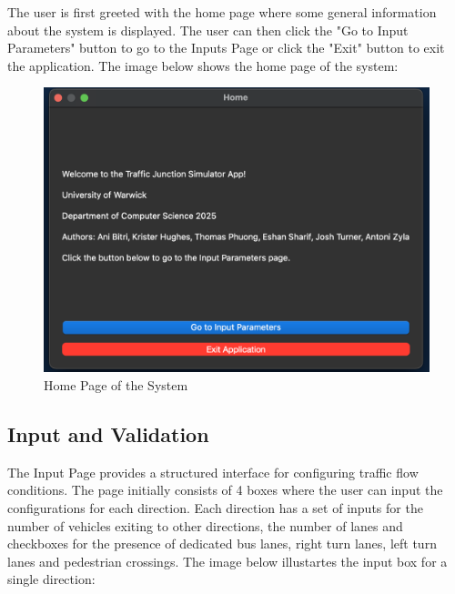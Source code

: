 \documentclass{article}
\begin{document}
        The user is first greeted with the home page where some general information about the system is displayed. The user can then click the "Go to Input Parameters" button to go to the Inputs Page 
        or click the "Exit" button to exit the application. The image below shows the home page of the system:

        \begin{figure}[H]
            \centering
            \includegraphics[width=\textwidth]{homepage.png}
            \caption{Home Page of the System}
            \label{fig:homepage}
        \end{figure}
    
    \subsection{Input and Validation}

        The Input Page provides a structured interface for configuring traffic flow conditions. The page initially consists of 4 boxes where the user can input the configurations for each direction. 
        Each direction has a set of inputs for the number of vehicles exiting to other directions, the number of lanes and checkboxes for the presence of dedicated bus lanes, right turn lanes, left turn lanes 
        and pedestrian crossings. The image below illustartes the input box for a single direction:
        
\end{document}
